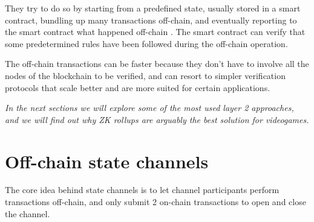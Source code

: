 \documentclass[12pt]{article}
\begin{document}
They try to do so by starting from a predefined state, usually stored in a smart contract, bundling up many transactions off-chain, and eventually reporting to the smart contract what happened off-chain \cite{ethereum_layer2}.
The smart contract can verify that some predetermined rules have been followed during the off-chain operation. 

The off-chain transactions can be faster because they don't have to involve all the nodes of the blockchain to be verified, and can resort to simpler verification protocols that scale better and are more suited for certain applications.

\emph{In the next sections we will explore some of the most used layer 2 approaches, and we will find out why ZK rollups are arguably the best solution for videogames.}

\section{Off-chain state channels} \label{section:ocsc}
The core idea behind state channels is to let channel participants perform transactions off-chain, and only submit 2 on-chain transactions to open and close the channel.
\end{document}
